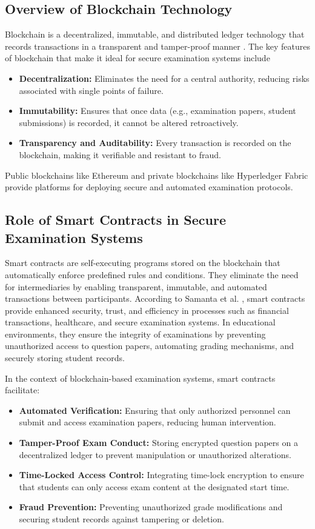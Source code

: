 \documentclass[12pt,a4paper]{article}
\begin{document}
\subsection{Overview of Blockchain Technology}
Blockchain is a decentralized, immutable, and distributed ledger technology that records transactions in a transparent and tamper-proof manner \cite{samanta2021blockchain}. The key features of blockchain that make it ideal for secure examination systems include
\begin{itemize}
    \item \textbf{Decentralization:} Eliminates the need for a central authority, reducing risks associated with single points of failure.
    \item \textbf{Immutability:} Ensures that once data (e.g., examination papers, student submissions) is recorded, it cannot be altered retroactively.
    \item \textbf{Transparency and Auditability:} Every transaction is recorded on the blockchain, making it verifiable and resistant to fraud.
\end{itemize}

Public blockchains like Ethereum and private blockchains like Hyperledger Fabric provide platforms for deploying secure and automated examination protocols.

\subsection{Role of Smart Contracts in Secure Examination Systems}
Smart contracts are self-executing programs stored on the blockchain that automatically enforce predefined rules and conditions. They eliminate the need for intermediaries by enabling transparent, immutable, and automated transactions between participants. According to Samanta et al. \cite{samanta2021blockchain}, smart contracts provide enhanced security, trust, and efficiency in processes such as financial transactions, healthcare, and secure examination systems. In educational environments, they ensure the integrity of examinations by preventing unauthorized access to question papers, automating grading mechanisms, and securely storing student records.

In the context of blockchain-based examination systems, smart contracts facilitate:
\begin{itemize}
    \item \textbf{Automated Verification:} Ensuring that only authorized personnel can submit and access examination papers, reducing human intervention.
    \item \textbf{Tamper-Proof Exam Conduct:} Storing encrypted question papers on a decentralized ledger to prevent manipulation or unauthorized alterations.
    \item \textbf{Time-Locked Access Control:} Integrating time-lock encryption to ensure that students can only access exam content at the designated start time.
    \item \textbf{Fraud Prevention:} Preventing unauthorized grade modifications and securing student records against tampering or deletion.
\end{itemize}
\end{document}
